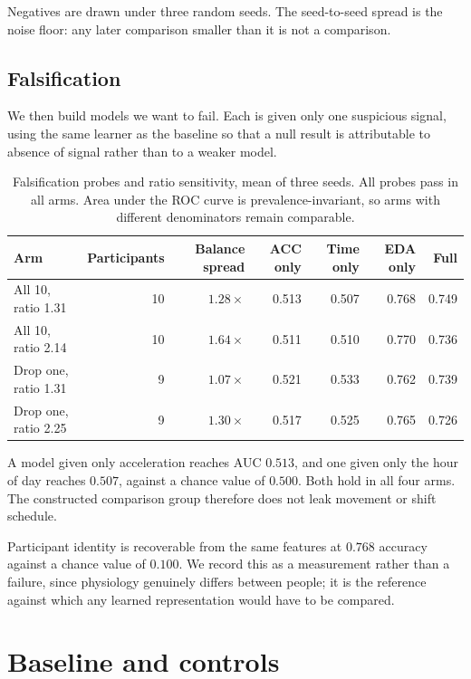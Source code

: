 \documentclass{article}
\begin{document}
Negatives are drawn under three random seeds. The seed-to-seed spread is the
noise floor: any later comparison smaller than it is not a comparison.

\subsection{Falsification}

We then build models we want to fail. Each is given only one suspicious signal,
using the same learner as the baseline so that a null result is attributable to
absence of signal rather than to a weaker model.

\begin{table}[t]
\caption{Falsification probes and ratio sensitivity, mean of three seeds. All
probes pass in all arms. Area under the ROC curve is prevalence-invariant, so
arms with different denominators remain comparable.}
\label{tab:sens}
\centering
\small
\begin{tabular}{lrrrrrr}
\toprule
Arm & Participants & Balance spread & ACC only & Time only & EDA only & Full \\
\midrule
All 10, ratio 1.31   & 10 & $1.28\times$ & 0.513 & 0.507 & 0.768 & 0.749 \\
All 10, ratio 2.14   & 10 & $1.64\times$ & 0.511 & 0.510 & 0.770 & 0.736 \\
Drop one, ratio 1.31 &  9 & $1.07\times$ & 0.521 & 0.533 & 0.762 & 0.739 \\
Drop one, ratio 2.25 &  9 & $1.30\times$ & 0.517 & 0.525 & 0.765 & 0.726 \\
\bottomrule
\end{tabular}
\end{table}

A model given only acceleration reaches AUC $0.513$, and one given only the
hour of day reaches $0.507$, against a chance value of $0.500$. Both hold in
all four arms. The constructed comparison group therefore does not leak
movement or shift schedule.

Participant identity is recoverable from the same features at $0.768$ accuracy
against a chance value of $0.100$. We record this as a measurement rather than
a failure, since physiology genuinely differs between people; it is the
reference against which any learned representation would have to be compared.

\section{Baseline and controls}
\label{sec:baseline}
\end{document}
